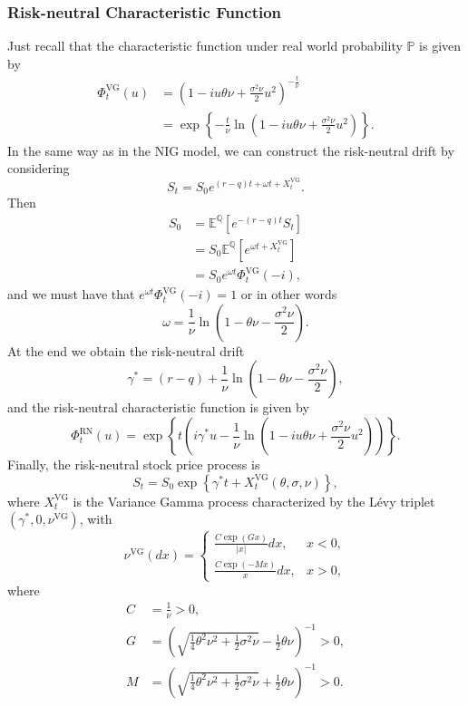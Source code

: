 \subsubsection*{Risk-neutral Characteristic Function}
Just recall that the characteristic function under real world probability $\mathbb{P}$ is given by
\begin{align*}
\Phi_t^\text{VG}(u)&=\left(1-iu\theta\nu+\frac{\sigma^2\nu}{2}u^2\right)^{-\frac{t}{\nu}}\\
&=\exp\left\{-\frac{t}{\nu}\ln\left(1-iu\theta\nu+\frac{\sigma^2\nu}{2}u^2\right)\right\}.
\end{align*}
In the same way as in the NIG model, we can construct the risk-neutral drift by considering
$$S_t=S_0 e^{(r-q)t+\omega t +X_t^\text{VG}}.$$
Then
\begin{align*}
S_0&=\mathbb{E}^\mathbb{Q}\left[e^{-(r-q)t}S_t\right]\\
&=S_0\mathbb{E}^\mathbb{Q}\left[e^{\omega t + X^\text{VG}_t}\right]\\
&=S_0e^{\omega t}\Phi_t^\text{VG}(-i),
\end{align*}
and we must have that $e^{\omega t}\Phi^\text{VG}_t(-i) = 1$ or in other words
$$\omega = \frac{1}{\nu}\ln\left(1-\theta\nu-\frac{\sigma^2\nu}{2}\right).$$
At the end we obtain the risk-neutral drift
$$\gamma^\ast = (r-q) + \frac{1}{\nu}\ln\left(1-\theta\nu-\frac{\sigma^2\nu}{2}\right),$$
and the risk-neutral characteristic function is given by
$$\Phi_t^\text{RN}(u)=\exp\left\{t\left(i\gamma^\ast u-\frac{1}{\nu}\ln\left(1-iu\theta\nu+\frac{\sigma^2\nu}{2}u^2\right)\right)\right\}.$$
Finally, the risk-neutral stock price process is 
$$S_t = S_0\exp\left\{\gamma^\ast t+X_t^\text{VG}(\theta,\sigma,\nu)\right\},$$
where $X_t^\text{VG}$ is the Variance Gamma process characterized by the L\'evy triplet $(\gamma^\ast,0,\nu^\text{VG})$, with
$$\nu^\text{VG}(dx) = \begin{cases}
\frac{C\exp(Gx)}{|x|}dx,&x<0,\\
\frac{C\exp(-Mx)}{x}dx,&x>0,
\end{cases}$$
where
\begin{align*}
C &= \frac{1}{\nu}>0,\\
G &= \left(\sqrt{\frac{1}{4}\theta^2\nu^2+\frac{1}{2}\sigma^2\nu}-\frac{1}{2}\theta \nu\right)^{-1}>0,\\
M &=\left(\sqrt{\frac{1}{4}\theta^2\nu^2+\frac{1}{2}\sigma^2\nu}+\frac{1}{2}\theta \nu\right)^{-1}>0.
\end{align*}
